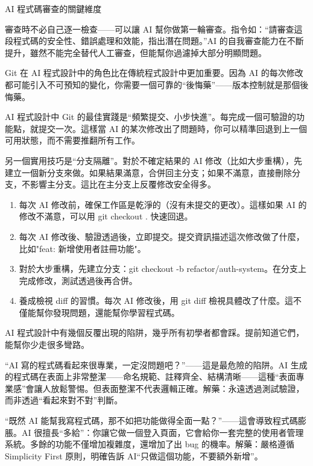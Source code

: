 \begin{center}\small\color{gray}AI 程式碼審查的關鍵維度\end{center}

審查時不必自己逐一檢查——可以讓 AI 幫你做第一輪審查。指令如：“請審查這段程式碼的安全性、錯誤處理和效能，指出潛在問題。”AI 的自我審查能力在不斷提升，雖然不能完全替代人工審查，但能幫你過濾掉大部分明顯問題。


Git 在 AI 程式設計中的角色比在傳統程式設計中更加重要。因為 AI 的每次修改都可能引入不可預知的變化，你需要一個可靠的“後悔藥”——版本控制就是那個後悔藥。

AI 程式設計中 Git 的最佳實踐是“頻繁提交、小步快進”。每完成一個可驗證的功能點，就提交一次。這樣當 AI 的某次修改出了問題時，你可以精準回退到上一個可用狀態，而不需要推翻所有工作。

另一個實用技巧是“分支隔離”。對於不確定結果的 AI 修改（比如大步重構），先建立一個新分支來做。如果結果滿意，合併回主分支；如果不滿意，直接刪除分支，不影響主分支。這比在主分支上反覆修改安全得多。

\begin{enumerate}
  \item 每次 AI 修改前，確保工作區是乾淨的（沒有未提交的更改）。這樣如果 AI 的修改不滿意，可以用 git checkout . 快速回退。
  \item 每次 AI 修改後、驗證透過後，立即提交。提交資訊描述這次修改做了什麼，比如"feat: 新增使用者註冊功能"。
  \item 對於大步重構，先建立分支：git checkout -b refactor/auth-system。在分支上完成修改，測試透過後再合併。
  \item 養成檢視 diff 的習慣。每次 AI 修改後，用 git diff 檢視具體改了什麼。這不僅能幫你發現問題，還能幫你學習程式碼。
\end{enumerate}


AI 程式設計中有幾個反覆出現的陷阱，幾乎所有初學者都會踩。提前知道它們，能幫你少走很多彎路。


“AI 寫的程式碼看起來很專業，一定沒問題吧？”——這是最危險的陷阱。AI 生成的程式碼在表面上非常整潔——命名規範、註釋齊全、結構清晰——這種“表面專業感”會讓人放鬆警惕。但表面整潔不代表邏輯正確。解藥：永遠透過測試驗證，而非透過“看起來對不對”判斷。


“既然 AI 能幫我寫程式碼，那不如把功能做得全面一點？”——這會導致程式碼膨脹。AI 很擅長“多給”：你讓它做一個登入頁面，它會給你一套完整的使用者管理系統。多餘的功能不僅增加複雜度，還增加了出 bug 的機率。解藥：嚴格遵循 Simplicity First 原則，明確告訴 AI“只做這個功能，不要額外新增”。

